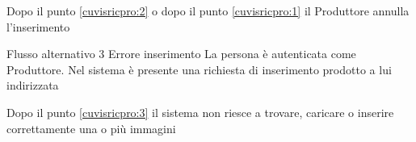 {\postNulle}%
{\begin{enumCU}
		\item Dopo il punto \ref{cuvisricpro:2} o dopo il punto \ref{cuvisricpro:1} il Produttore annulla l'inserimento
	\end{enumCU}}%
%
{Flusso alternativo 3}%
{Errore inserimento}%
{La persona è autenticata come Produttore. Nel sistema è presente una richiesta di inserimento prodotto a lui indirizzata}
{\postNulle}%
{\begin{enumCU}
		\item Dopo il punto \ref{cuvisricpro:3} il sistema non riesce a trovare, caricare o inserire correttamente una o più immagini
	\end{enumCU}}%

\tabcuvspace

